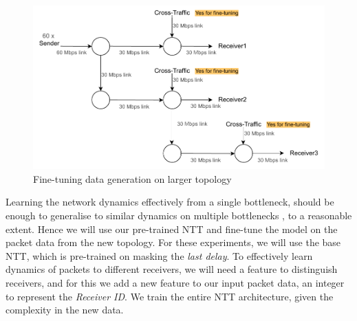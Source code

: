 \begin{figure}[h]
  \begin{center}
    \includegraphics[scale=0.7]{figures/complex_topo.pdf}
    \caption{Fine-tuning data generation on larger topology}
    \label{fig:topo_ft_big}
  \end{center}
\end{figure}

Learning the network dynamics effectively from a single bottleneck, should be enough to generalise to similar dynamics on multiple bottlenecks , to a reasonable extent. Hence we will use our pre-trained NTT and fine-tune the model on the packet data from the new topology. For these experiments, we will use the base NTT, which is pre-trained on masking the \emph{last delay}. To effectively learn dynamics of packets to different receivers, we will need a feature to distinguish receivers, and for this we add a new feature to our input packet data, an integer to represent the \emph{Receiver ID}. We train the entire NTT architecture, given the complexity in the new data.

